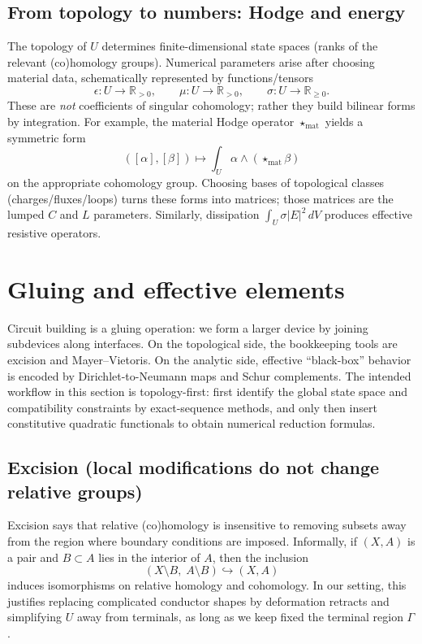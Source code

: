 \documentclass[11pt]{article}
\begin{document}
\subsection{From topology to numbers: Hodge and energy}
\label{sec:elements-as-pairings}
The topology of $U$ determines finite-dimensional state spaces (ranks of the relevant (co)homology groups).
Numerical parameters arise after choosing material data, schematically represented by functions/tensors
\[
\epsilon\colon U\to \mathbb{R}_{>0},\qquad \mu\colon U\to \mathbb{R}_{>0},\qquad \sigma\colon U\to \mathbb{R}_{\ge 0}.
\]
These are \emph{not} coefficients of singular cohomology; rather they build bilinear forms by integration.
For example, the material Hodge operator $\star_{\mathrm{mat}}$ yields a symmetric form
\[
([\alpha],[\beta])\longmapsto \int_U \alpha\wedge(\star_{\mathrm{mat}}\beta)
\]
on the appropriate cohomology group.
Choosing bases of topological classes (charges/fluxes/loops) turns these forms into matrices; those matrices are the lumped $C$ and $L$ parameters.
Similarly, dissipation $\int_U \sigma |E|^2\,dV$ produces effective resistive operators.

\section{Gluing and effective elements}
\label{sec:gluing}
Circuit building is a gluing operation: we form a larger device by joining subdevices along interfaces.
On the topological side, the bookkeeping tools are excision and Mayer--Vietoris.
On the analytic side, effective ``black-box'' behavior is encoded by Dirichlet-to-Neumann maps and Schur complements.
The intended workflow in this section is topology-first: first identify the global state space and compatibility constraints by exact-sequence methods, and only then insert constitutive quadratic functionals to obtain numerical reduction formulas.

\subsection{Excision (local modifications do not change relative groups)}
\label{sec:excision}
Excision says that relative (co)homology is insensitive to removing subsets away from the region where boundary conditions are imposed.
Informally, if $(X,A)$ is a pair and $B\subset A$ lies in the interior of $A$, then the inclusion
\[
(X\setminus B,\; A\setminus B)\hookrightarrow (X,A)
\]
induces isomorphisms on relative homology and cohomology.
In our setting, this justifies replacing complicated conductor shapes by deformation retracts and simplifying $U$ away from terminals, as long as we keep fixed the terminal region $\Gamma$.
\end{document}
